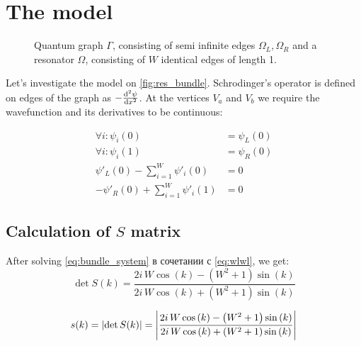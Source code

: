\documentclass[12pt, a4paper]{article}
\newcommand{\mtodo}[1]{\todo[linecolor=green!70!white, backgroundcolor=blue!20!white, bordercolor=red]{#1}}
\theoremstyle{plain}
\begin{document}
\section{The model}
\begin{figure}
\centering
\begin{tikzpicture}[scale=1.1] %

\end{tikzpicture}
\caption{Quantum graph $\Gamma$, consisting of semi infinite edges  $\Omega_L, \Omega_R$ and a resonator $\Omega$, consisting of $W$ identical edges of length 1.}
\label{fig:res_bundle}
\end{figure}

Let's investigate the model on \autoref{fig:res_bundle}. Schrodinger's operator is defined on edges of the graph as  $-\dv[2]{\psi}{x}$. At the vertices $V_a$ and $V_b$ we require the wavefunction and its derivatives to be continuous:

\begin{equation}\label{eq:bundle_system}
\begin{aligned}
   \forall i: \psi_i(0) &= \psi_L(0)
\\ \forall i: \psi_i(1) &= \psi_R(0)
\\ \psi'_L(0) - \sum\limits_{i = 1}^W \psi'_i(0) &= 0
\\ -\psi'_R(0) + \sum\limits_{i = 1}^W \psi'_i(1) &= 0
\end{aligned}
\end{equation}

\subsection{Calculation of $S$ matrix}
After solving \ref{eq:bundle_system} в сочетании с \ref{eq:wlwl}, we get:
\begin{equation*}
\det S(k) = \frac{2 i \, W \cos\left(k\right) - {\left(W^{2} + 1\right)} \sin\left(k\right)}{2 i \, W \cos\left(k\right) + {\left(W^{2} + 1\right)} \sin\left(k\right)}
\end{equation*}


\begin{equation}\label{eq:bundle_s}
s(k) = \abs{\det S(k)} = \abs{\frac{2 i \, W \cos\left(k\right) - {\left(W^{2} + 1\right)} \sin\left(k\right)}{2 i \, W \cos\left(k\right) + {\left(W^{2} + 1\right)} \sin\left(k\right)}}
\end{equation}

\mtodo{график S-матрицы?}
\end{document}
